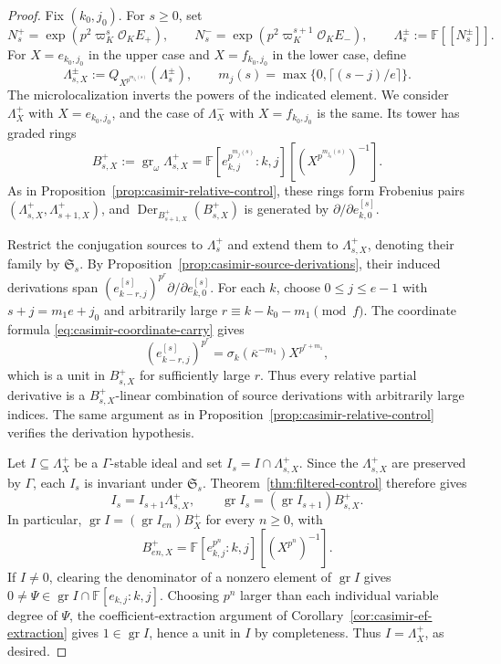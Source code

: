 \documentclass[11pt]{article}
\numberwithin{equation}{section}
\theoremstyle{definition}
\theoremstyle{remark}
\newcommand{\F}{\mathbb F}
\newcommand{\cO}{\mathcal O}
\DeclareMathOperator{\gr}{gr}
\DeclareMathOperator{\Der}{Der}
\begin{document}
\begin{proof}
Fix $(k_0,j_0)$. For $s\geq0$, set
\[
 N_s^+=\exp(p^2\varpi_K^s\cO_KE_+),\qquad
 N_s^-=\exp(p^2\varpi_K^{s+1}\cO_KE_-),\qquad
 \Lambda_s^\pm:=\F[[N_s^\pm]].
\]
For $X=e_{k_0,j_0}$ in the upper case and $X=f_{k_0,j_0}$ in the
lower case, define
\[
 \Lambda_{s,X}^\pm:=Q_{X^{p^{m_{j_0}(s)}}}(\Lambda_s^\pm),
 \qquad m_j(s)=\max\{0,\lceil(s-j)/e\rceil\}.
\]
The microlocalization inverts the powers of the indicated element. 
We consider $\Lambda_X^+$ with $X=e_{k_0,j_0}$, 
and the case of $\Lambda_X^-$ with $X=f_{k_0,j_0}$ is the same. Its tower has graded rings
\[
 B_{s,X}^+:=\gr_\omega\Lambda_{s,X}^+
 =\F[e_{k,j}^{p^{m_j(s)}}:k,j]
       [(X^{p^{m_{j_0}(s)}})^{-1}].
\]
As in Proposition~\ref{prop:casimir-relative-control}, these
rings form Frobenius pairs $(\Lambda_{s,X}^+,\Lambda_{s+1,X}^+)$, and
$\Der_{B_{s+1,X}^+}(B_{s,X}^+)$ is generated by
$\partial/\partial e_{k,0}^{[s]}$.

Restrict the conjugation sources to $\Lambda_s^+$ and extend
them to $\Lambda_{s,X}^+$, denoting their family by $\mathfrak S_s$.
By Proposition~\ref{prop:casimir-source-derivations}, their
induced derivations span
$(e_{k-r,j}^{[s]})^{p^r}\partial/\partial e_{k,0}^{[s]}$.
For each $k$, choose $0\leq j\leq e-1$ with $s+j=m_1e+j_0$ and arbitrarily
large $r\equiv k-k_0-m_1\pmod f$. The coordinate formula
\eqref{eq:casimir-coordinate-carry} gives
\[
 (e_{k-r,j}^{[s]})^{p^r}
 =\sigma_k(\overline\kappa^{-m_1})X^{p^{r+m_1}},
\]
which is a unit in $B_{s,X}^+$ for sufficiently large $r$.
Thus every relative partial derivative is a $B_{s,X}^+$-linear
combination of source derivations with arbitrarily large indices.
The same argument as in
Proposition~\ref{prop:casimir-relative-control} verifies the
derivation hypothesis.

Let $I\subseteq\Lambda_X^+$ be a $\Gamma$-stable ideal and set
$I_s=I\cap\Lambda_{s,X}^+$. Since the $\Lambda_{s,X}^+$ are preserved by $\Gamma$,
each $I_s$ is invariant under $\mathfrak S_s$.
Theorem~\ref{thm:filtered-control} therefore gives
\[
 I_s=I_{s+1}\Lambda_{s,X}^+,\qquad
 \gr I_s=(\gr I_{s+1})B_{s,X}^+.
\]
In particular, $\gr I=(\gr I_{en})B_X^+$ for every $n\geq0$, with
\[
 B_{en,X}^+=\F[e_{k,j}^{p^n}:k,j][(X^{p^n})^{-1}].
\]
If $I\ne0$, clearing the denominator of a nonzero element of
$\gr I$ gives $0\ne\Psi\in\gr I\cap\F[e_{k,j}:k,j]$.
Choosing $p^n$ larger than each individual variable degree of
$\Psi$, the coefficient-extraction argument of
Corollary~\ref{cor:casimir-ef-extraction} gives
$1\in\gr I$, hence a unit in $I$ by completeness. Thus $I=\Lambda_X^+$, as desired. 
\end{proof}
\end{document}
